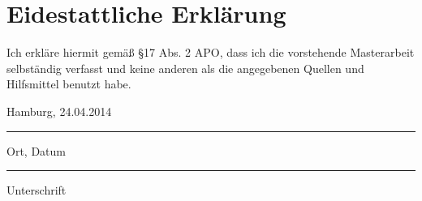 \chapter*{Eidestattliche Erklärung}
\label{sec:S9_Eid}



Ich erkläre hiermit gemäß §17 Abs. 2 APO, dass ich die vorstehende Masterarbeit selbständig verfasst und keine anderen als die angegebenen Quellen und Hilfsmittel benutzt habe.
\vspace{5cm}



\parbox{5cm}{\centering Hamburg, 24.04.2014\hrule
\strut \centering Ort, Datum} \hfill
\parbox{5cm}{  \hrule
\strut \centering Unterschrift}
